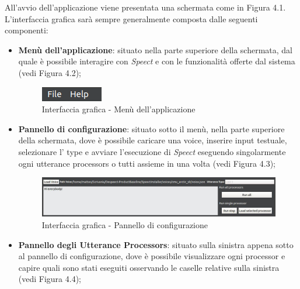 \documentclass[openany,12pt,a4paper]{report}
\begin{document}
	All'avvio dell'applicazione viene presentata una schermata come in Figura 4.1.\\
 	L'interfaccia grafica sarà sempre generalmente composta dalle seguenti componenti:
 	\begin{itemize}
 		\item \textbf{Menù dell'applicazione}: situato nella parte superiore della schermata, dal quale è possibile interagire con \textit{Speect} e con le funzionalità offerte dal sistema (vedi Figura 4.2);
 		\begin{figure}[H]
 			
 			\centering
 			
 			\includegraphics[width=.3\textwidth]{./img/menu}
 			
 			\caption{Interfaccia grafica - Menù dell'applicazione}
 			
 		\end{figure}
 	
 		\item \textbf{Pannello di configurazione}: situato sotto il menù, nella parte superiore della schermata, dove è possibile caricare una voice, inserire input testuale, selezionare l' type e avviare l'esecuzione di \textit{Speect} eseguendo singolarmente ogni utterance processors o tutti assieme in una volta (vedi Figura 4.3);
 		\begin{figure}[H]
 			
 			\centering
 			
 			\includegraphics[width=\textwidth]{./img/pannello_configurazione}
 			
 			\caption{Interfaccia grafica - Pannello di configurazione}
 			
 		\end{figure}
 	
 		\item \textbf{Pannello degli Utterance Processors}: situato sulla sinistra appena sotto al pannello di configurazione, dove è possibile visualizzare ogni processor e capire quali sono stati eseguiti osservando le caselle relative sulla sinistra (vedi Figura 4.4);
 		\begin{figure}[H]
 			

\end{figure}
\end{itemize}
\end{document}
